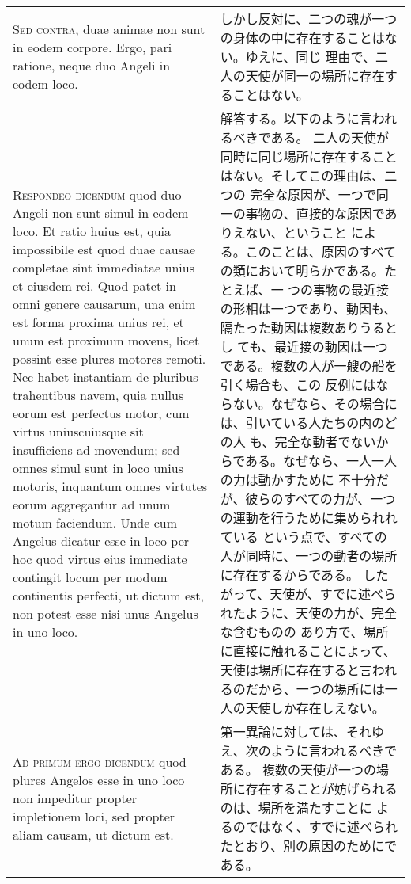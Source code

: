 \documentclass[10pt]{jsarticle} %
\begin{document}
\begin{longtable}{p{21em}p{21em}}
{\scshape Sed contra}, duae animae non sunt in eodem
 corpore. Ergo, pari ratione, neque duo Angeli in eodem loco.

&

しかし反対に、二つの魂が一つの身体の中に存在することはない。ゆえに、同じ
 理由で、二人の天使が同一の場所に存在することはない。

\\



{\scshape Respondeo dicendum} quod duo Angeli non sunt
 simul in eodem loco. Et ratio huius est, quia impossibile est quod duae
 causae completae sint immediatae unius et eiusdem rei. Quod patet in
 omni genere causarum, una enim est forma proxima unius rei, et unum est
 proximum movens, licet possint esse plures motores remoti. Nec habet
 instantiam de pluribus trahentibus navem, quia nullus eorum est
 perfectus motor, cum virtus uniuscuiusque sit insufficiens ad movendum;
 sed omnes simul sunt in loco unius motoris, inquantum omnes virtutes
 eorum aggregantur ad unum motum faciendum. Unde cum Angelus dicatur
 esse in loco per hoc quod virtus eius immediate contingit locum per
 modum continentis perfecti, ut dictum est, non potest esse nisi unus
 Angelus in uno loco.

&
解答する。以下のように言われるべきである。
二人の天使が同時に同じ場所に存在することはない。そしてこの理由は、二つの
 完全な原因が、一つで同一の事物の、直接的な原因でありえない、ということ
 による。このことは、原因のすべての類において明らかである。たとえば、一
 つの事物の最近接の形相は一つであり、動因も、隔たった動因は複数ありうるとし
 ても、最近接の動因は一つである。複数の人が一艘の船を引く場合も、この
 反例にはならない。なぜなら、その場合には、引いている人たちの内のどの人
 も、完全な動者でないからである。なぜなら、一人一人の力は動かすために
 不十分だが、彼らのすべての力が、一つの運動を行うために集められれている
 という点で、すべての人が同時に、一つの動者の場所に存在するからである。
したがって、天使が、すでに述べられたように、天使の力が、完全な含むものの
 あり方で、場所に直接に触れることによって、天使は場所に存在すると言われ
 るのだから、一つの場所には一人の天使しか存在しえない。

\\



{\scshape Ad primum ergo dicendum} quod plures Angelos
 esse in uno loco non impeditur propter impletionem loci, sed propter
 aliam causam, ut dictum est.

&
第一異論に対しては、それゆえ、次のように言われるべきである。
複数の天使が一つの場所に存在することが妨げられるのは、場所を満たすことに
 よるのではなく、すでに述べられたとおり、別の原因のためにである。


\end{longtable}
\end{document}
